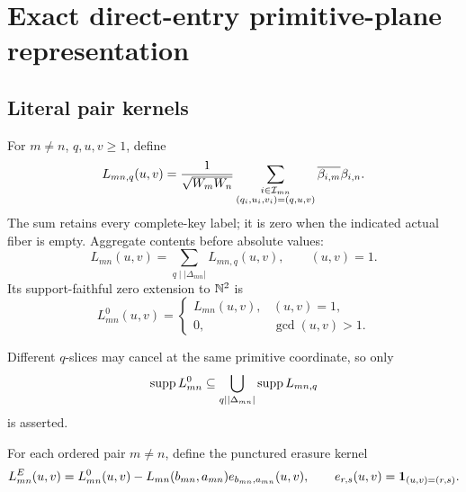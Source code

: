 \section{Exact direct-entry primitive-plane representation}
\label{sec:exact-representation}

\subsection{Literal pair kernels}

\begin{definition}
\label{def:complete-key-entry-kernel}
For \(m\ne n\), \(q,u,v\ge1\), define
\begin{equation}
 L_{mn,q}(u,v)
 =
 \frac1{\sqrt{W_mW_n}}
 \sum_{\substack{i\in\mathcal I_{mn}\\
                  (q_i,u_i,v_i)=(q,u,v)}}
 \overline{\beta_{i,m}}\beta_{i,n}.
 \label{eq:q-slice-entry-kernel}
\end{equation}
The sum retains every complete-key label; it is zero when the indicated
actual fiber is empty.  Aggregate contents before absolute values:
\begin{equation}
 L_{mn}(u,v)
 =
 \sum_{q\mid|\Delta_{mn}|}L_{mn,q}(u,v),
 \qquad (u,v)=1.
 \label{eq:aggregate-entry-kernel}
\end{equation}
Its support-faithful zero extension to \(\mathbb N^2\) is
\begin{equation}
 L_{mn}^{0}(u,v)
 =
 \begin{cases}
  L_{mn}(u,v),&(u,v)=1,\\
  0,&\gcd(u,v)>1.
 \end{cases}
 \label{eq:zero-entry-kernel}
\end{equation}
\end{definition}

Different \(q\)-slices may cancel at the same primitive coordinate, so
only
\[
 \operatorname{supp} L_{mn}^{0}
 \subseteq
 \bigcup_{q\mid|\Delta_{mn}|}\operatorname{supp} L_{mn,q}
\]
is asserted.

For each ordered pair \(m\ne n\), define the punctured erasure kernel
\begin{equation}
 L_{mn}^{E}(u,v)
 =
 L_{mn}^{0}(u,v)
 -L_{mn}(b_{mn},a_{mn})e_{b_{mn},a_{mn}}(u,v),
 \qquad
 e_{r,s}(u,v)=\mathbf 1_{(u,v)=(r,s)}.
 \label{eq:punctured-entry-kernel}
\end{equation}

